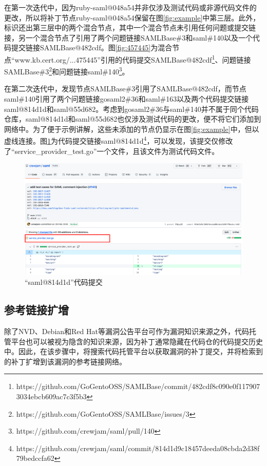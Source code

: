\begin{exmp}
在第一次迭代中，因为ruby-saml@048a54并非仅涉及测试代码或非源代码文件的更改，所以\tool 将补丁节点ruby-saml@048a54保留在图\ref{fig:example}中第三层。此外，\tool 标识还出第三层中的两个混合节点，其中一个混合节点未引用任何问题或提交链接，另一个混合节点了引用了两个问题链接SAMLBase\#3和saml\#140以及一个代码提交链接SAMLBase@482cdf。图\ref{fig:457445}为混合节点“www.kb.cert.org/...475445”引用的代码提交SAMLBase@482cdf\footnote{https://github.com/GoGentoOSS/SAMLBase/commit/482cdf8c090e0f1179073034ebcb609ac7c3f5b3}、问题链接SAMLBase\#3\footnote{https://github.com/GoGentoOSS/SAMLBase/issues/3}和问题链接saml\#140\footnote{https://github.com/crewjam/saml/pull/140}。

在第二次迭代中，\tool 发现节点SAMLBase\#3引用了SAMLBase@482cdf，而节点saml\#140引用了两个问题链接gosaml2\#36和saml\#163以及两个代码提交链接saml@814d1d和saml@55d682。考虑到gosaml2\#36与saml\#140并不属于同个代码仓库，saml@814d1d和saml@55d682也仅涉及测试代码的更改，\tool 便不将它们添加到网络中。为了便于示例讲解，这些未添加的节点仍显示在图\ref{fig:example}中，但以虚线连接。图\ref{fig:814d1d9}为代码提交链接saml@814d1d\footnote{https://github.com/crewjam/saml/commit/814d1d9c18457deeda08cbda2d38f79bedccfa62}，可以发现，该提交仅修改了“service\_provider\_test.go”一个文件，且该文件为测试代码文件。
\end{exmp}

\begin{figure}[!t]
    \centering
    \includegraphics[scale=0.29]{fig/commit-814d1d9}
    \caption{“saml@814d1d”代码提交}\label{fig:814d1d9}
\end{figure}

\subsection{参考链接扩增}\label{sec:addGithub}
除了NVD、Debian和Red Hat等漏洞公告平台可作为漏洞知识来源之外，代码托管平台也可以被视为隐含的知识来源，因为补丁通常隐藏在代码仓的代码提交历史中。因此，在该步骤中，\tool 将搜索代码托管平台以获取漏洞的补丁提交，并将检索到的补丁扩增到该漏洞的参考链接网络。

